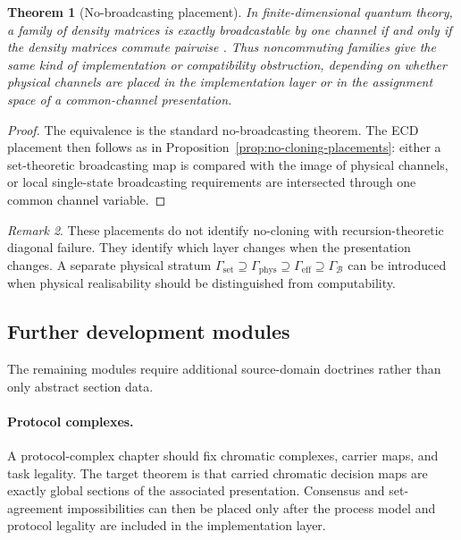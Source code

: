\documentclass[11pt]{article}
\theoremstyle{plain}
\newtheorem{theorem}{Theorem}[section]
\theoremstyle{definition}
\theoremstyle{remark}
\newtheorem{remark}[theorem]{Remark}
\begin{document}
\begin{theorem}[No-broadcasting placement]
\label{thm:no-broadcasting-placement}
In finite-dimensional quantum theory, a family of density matrices is exactly
broadcastable by one channel if and only if the density matrices commute
pairwise \cite{nobroadcasting}. Thus noncommuting families give the same kind of
implementation or compatibility obstruction, depending on whether physical
channels are placed in the implementation layer or in the assignment space of a
common-channel presentation.
\end{theorem}

\begin{proof}
The equivalence is the standard no-broadcasting theorem. The ECD placement then
follows as in Proposition~\ref{prop:no-cloning-placements}: either a
set-theoretic broadcasting map is compared with the image of physical channels,
or local single-state broadcasting requirements are intersected through one
common channel variable.
\end{proof}

\begin{remark}
These placements do not identify no-cloning with recursion-theoretic diagonal
failure. They identify which layer changes when the presentation changes. A
separate physical stratum
$\Gamma_{\mathrm{set}}\supseteq\Gamma_{\mathrm{phys}}\supseteq
\Gamma_{\mathrm{eff}}\supseteq\Gamma_{\mathcal B}$
can be introduced when physical realisability should be distinguished from
computability.
\end{remark}

\subsection{Further development modules}

The remaining modules require additional source-domain doctrines rather than only
abstract section data.

\paragraph{Protocol complexes.}
A protocol-complex chapter should fix chromatic complexes, carrier maps, and task
legality. The target theorem is that carried chromatic decision maps are exactly
global sections of the associated presentation. Consensus and set-agreement
impossibilities can then be placed only after the process model and protocol
legality are included in the implementation layer.
\end{document}
